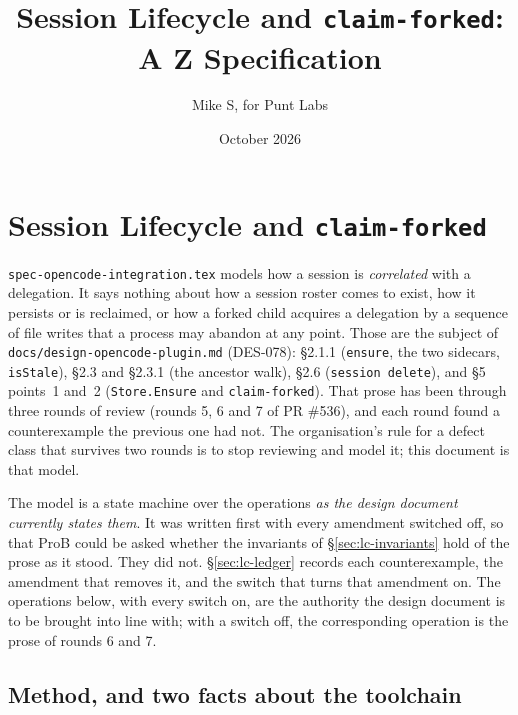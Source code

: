 \documentclass[a4paper,10pt,fleqn]{article}
\newcommand{\fpath}[1]{\texttt{#1}}
\newcommand{\field}[1]{\texttt{#1}}
\begin{document}
\title{Session Lifecycle and \texttt{claim-forked}: A Z Specification}
\author{Mike S, for Punt Labs}
\date{October 2026}
\maketitle
\tableofcontents
\newpage

\section{Session Lifecycle and \texttt{claim-forked}}
\label{sec:lifecycle}


\texttt{spec-opencode-integration.tex} models how a session is
\emph{correlated} with a delegation. It says nothing about how a session
roster comes to exist, how it persists or is reclaimed, or how a forked
child acquires a delegation by a sequence of file writes that a process
may abandon at any point. Those are the subject of
\fpath{docs/design-opencode-plugin.md} (DES-078): \S2.1.1 (\field{ensure},
the two sidecars, \field{isStale}), \S2.3 and \S2.3.1 (the ancestor walk),
\S2.6 (\field{session delete}), and \S5 points~1 and~2 (\field{Store.Ensure}
and \field{claim-forked}). That prose has been through three rounds of
review (rounds 5, 6 and 7 of PR \#536), and each round found a
counterexample the previous one had not. The organisation's rule for a
defect class that survives two rounds is to stop reviewing and model it;
this document is that model.

The model is a state machine over the operations \emph{as the design
document currently states them}. It was written first with every
amendment switched off, so that ProB could be asked whether the invariants
of \S\ref{sec:lc-invariants} hold of the prose as it stood. They did not.
\S\ref{sec:lc-ledger} records each counterexample, the amendment that
removes it, and the switch that turns that amendment on. The operations
below, with every switch on, are the authority the design document is to
be brought into line with; with a switch off, the corresponding operation
is the prose of rounds 6 and 7.

\subsection{Method, and two facts about the toolchain}
\label{sec:lc-method}
\end{document}
